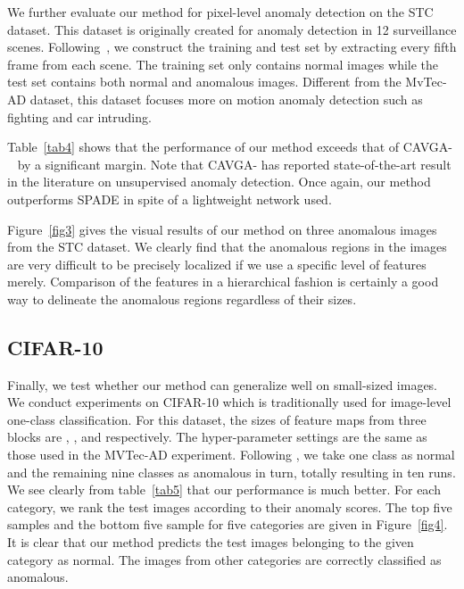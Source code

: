 \documentclass[final]{cvpr}
\begin{document}
{We further evaluate our method for pixel-level anomaly detection on the STC dataset. This dataset is originally created for anomaly detection in 12 surveillance scenes. Following~\cite{Venkataramanan2019}, we construct the training and test set by extracting every fifth frame from each scene. The training set only contains normal images while the test set contains both normal and anomalous images. Different from the MvTec-AD dataset, this dataset focuses more on motion anomaly detection such as fighting and car intruding.


Table~\ref{tab4} shows that the performance of our method exceeds that of CAVGA-~\cite{Venkataramanan2019} by a significant margin. Note that CAVGA- has reported state-of-the-art result in the literature on unsupervised anomaly detection. Once again, our method outperforms SPADE in spite of a lightweight network used.

Figure~\ref{fig3} gives the visual results of our method on three anomalous images from the STC dataset. We clearly find that the anomalous regions in the images are very difficult to be precisely localized if we use a specific level of features merely. Comparison of the features in a hierarchical fashion is certainly a good way to delineate the anomalous regions regardless of their sizes.

\subsection{CIFAR-10}
\label{sec4-sub4}

Finally, we test whether our method can generalize well on small-sized images. We conduct experiments on CIFAR-10 which is traditionally used for image-level one-class classification. For this dataset, the sizes of feature maps from three blocks are , , and  respectively. The hyper-parameter settings are the same as those used in the MVTec-AD experiment. Following \cite{Bergmann2020}, we take one class as normal and the remaining nine classes as anomalous in turn, totally resulting in ten runs. We see clearly from table~\ref{tab5} that our performance is much better. For each category, we rank the test images according to their anomaly scores. The top five samples and the bottom five sample for five categories are given in Figure~\ref{fig4}. It is clear that our method predicts the test images belonging to the given category as normal. The images from other categories are correctly classified as anomalous.

\iffalse
\begin{figure*}[!t]
	\centering
	\texttt{[image: figs/STC.pdf]}
	\caption{Visual results of our method on three anomalous images from the STC dataset. ResNet-18 is used as backbone and the three bottom blocks (\textit{i.e.}, conv2\_x, conv3\_x, conv4\_x) are selected as feature extractors. Columns from left to right correspond to input images, ground truth regions, anomaly maps of the three blocks, and the combined anomaly maps respectively.}
	\label{fig3}
\end{figure*}
\fi


}
\end{document}
